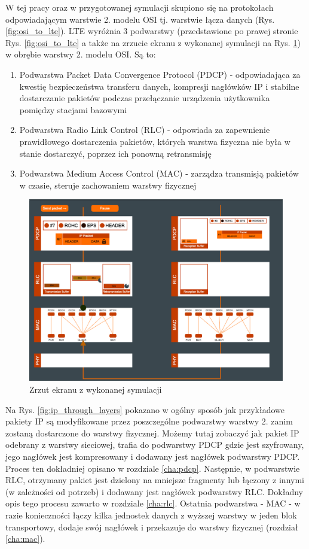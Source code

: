 W tej pracy oraz w przygotowanej symulacji skupiono się na protokołach odpowiadającym warstwie 2. modelu OSI tj. warstwie łącza danych (Rys. \ref{fig:osi_to_lte}). LTE wyróżnia 3 podwarstwy (przedstawione po prawej stronie Rys. \ref{fig:osi_to_lte} a także na zrzucie ekranu z wykonanej symulacji na Rys. \ref{fig:simulation2}) w obrębie warstwy 2. modelu OSI. Są to:

\begin{enumerate}
	\item Podwarstwa Packet Data Convergence Protocol (PDCP) - odpowiadająca za kwestię bezpieczeństwa transferu danych, kompresji nagłówków IP i stabilne dostarczanie pakietów podczas przełączanie urządzenia użytkownika pomiędzy stacjami bazowymi
	\item Podwarstwa Radio Link Control (RLC) - odpowiada za zapewnienie prawidłowego dostarczenia pakietów, których warstwa fizyczna nie była w stanie dostarczyć, poprzez ich ponowną retransmisję
	\item Podwarstwa Medium Access Control (MAC) - zarządza transmisją pakietów w czasie, steruje zachowaniem warstwy fizycznej
\end{enumerate}

\begin{figure}
	\centerline{\includegraphics[width=1.0\textwidth]{images/simulation.png}}
	\caption{Zrzut ekranu z wykonanej symulacji}
	\label{fig:simulation2}
\end{figure}

Na Rys. \ref{fig:ip_through_layers} pokazano w ogólny sposób jak przykładowe pakiety IP są modyfikowane przez poszczególne podwarstwy warstwy 2. zanim zostaną dostarczone do warstwy fizycznej. Możemy tutaj zobaczyć jak pakiet IP odebrany z warstwy sieciowej, trafia do podwarstwy PDCP gdzie jest szyfrowany, jego nagłówek jest kompresowany i dodawany jest nagłówek podwarstwy PDCP. Proces ten dokładniej opisano w rozdziale \ref{cha:pdcp}. Następnie, w podwarstwie RLC, otrzymany pakiet jest dzielony na mniejsze fragmenty lub łączony z innymi (w zależności od potrzeb) i dodawany jest nagłówek podwarstwy RLC. Dokładny opis tego procesu zawarto w rozdziale \ref{cha:rlc}. Ostatnia podwarstwa - MAC - w razie konieczności łączy kilka jednostek danych z wyższej warstwy w jeden blok transportowy, dodaje swój nagłówek i przekazuje do warstwy fizycznej (rozdział \ref{cha:mac}).

